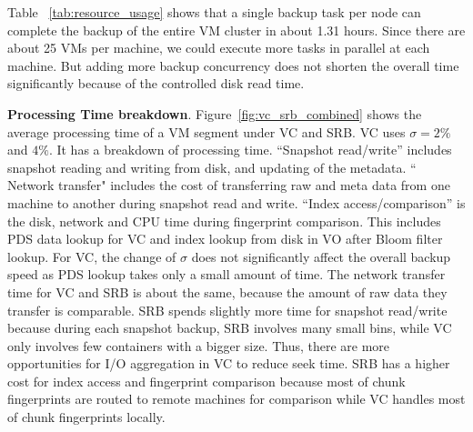 Table ~\ref{tab:resource_usage} shows that  a single backup task per node can complete the backup of the entire
VM cluster in about 1.31 hours. Since there are about 25 VMs per machine, we could execute
more tasks in parallel at each machine. But adding more backup concurrency does not shorten the overall time
significantly because of the controlled  disk read time.

{\bf Processing Time breakdown}.
Figure~\ref{fig:vc_srb_combined} shows
the  average  processing  time of  a VM segment under VC and SRB. 
VC uses $\sigma=2\%$ and $4\%$.
It has a breakdown of processing time.
``Snapshot read/write'' includes snapshot reading and writing from disk, and 
updating of the metadata.
`` Network transfer" includes the cost of transferring raw and meta data from one machine to another during 
snapshot read and write.
``Index access/comparison'' is the disk, network and CPU time during fingerprint comparison.
This includes PDS data lookup for VC and index lookup from disk in VO after Bloom filter lookup.
For VC, the change of $\sigma$ does not significantly affect the overall backup speed as
PDS lookup takes only a small amount of time. The network transfer time for VC and SRB is about the same, because the 
amount of raw data they transfer is comparable.
SRB spends slightly more time for snapshot read/write because during each snapshot  backup, SRB involves many small bins,
 while VC only involves few containers with a bigger size. Thus, there are more opportunities for I/O aggregation in VC to reduce seek time.
SRB has a higher cost for index access and fingerprint comparison because most of  chunk fingerprints are routed
to remote machines for comparison while   VC handles most of chunk fingerprints locally. 


